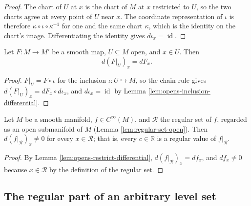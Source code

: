 \begin{proof}
\leanok
The chart of $U$ at $x$ is the chart of $M$ at $x$ restricted to $U$, so the two charts agree at every point of $U$ near $x$. The coordinate representation of $\iota$ is therefore $\kappa \circ \iota \circ \kappa^{-1}$ for one and the same chart $\kappa$, which is the identity on the chart's image. Differentiating the identity gives $d\iota_x = \operatorname{id}$.
\end{proof}

\begin{lemma}
\label{lem:opens-restrict-differential}
\leanok
{}
Let $F : M \to M'$ be a smooth map, $U \subseteq M$ open, and $x \in U$. Then
\[
  d(F|_U)_x = dF_x .
\]
\end{lemma}

\begin{proof}
\leanok
{}
$F|_U = F \circ \iota$ for the inclusion $\iota : U \hookrightarrow M$, so the chain rule gives $d(F|_U)_x = dF_x \circ d\iota_x$, and $d\iota_x = \operatorname{id}$ by Lemma \ref{lem:opens-inclusion-differential}.
\end{proof}

\begin{lemma}
\label{lem:regular-restrict-regular-value}
\leanok
{}
Let $M$ be a smooth manifold, $f \in C^\infty(M)$, and $\mathcal{R}$ the regular set of $f$, regarded as an open submanifold of $M$ (Lemma \ref{lem:regular-set-open}). Then $d(f|_{\mathcal{R}})_x \neq 0$ for every $x \in \mathcal{R}$; that is, every $c \in \mathbb{R}$ is a regular value of $f|_{\mathcal{R}}$.
\end{lemma}

\begin{proof}
\leanok
{}
By Lemma \ref{lem:opens-restrict-differential}, $d(f|_{\mathcal{R}})_x = df_x$, and $df_x \neq 0$ because $x \in \mathcal{R}$ by the definition of the regular set.
\end{proof}

\subsection*{The regular part of an arbitrary level set}

